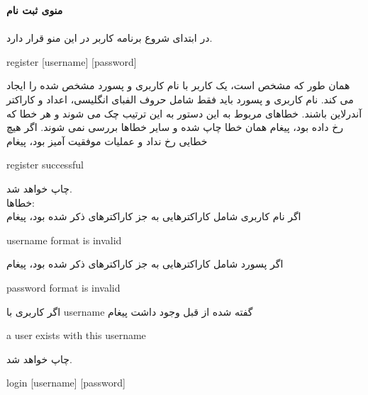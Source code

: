 \documentclass[]{article}
\begin{document}
\textbf{منوی ثبت نام}
\\\\در ابتدای شروع برنامه کاربر در این منو قرار دارد.
\begin{tcolorbox}[boxrule=0pt]
	\begin{latin}
  	  \large{
  	  	register [username] [password]
		}
	\end{latin}
\end{tcolorbox}
همان طور که مشخص است، یک کاربر با نام کاربری و پسورد مشخص شده را ایجاد می کند. نام کاربری و پسورد باید فقط شامل حروف الفبای انگلیسی، اعداد و کاراکتر آندرلاین  باشند. خطاهای مربوط به این دستور به این ترتیب چک می شوند و هر خطا که رخ داده بود، پیغام همان خطا چاپ شده و سایر خطاها بررسی نمی شوند. اگر هیچ خطایی رخ نداد و عملیات موفقیت آمیز بود، پیغام
\begin{tcolorbox}[boxrule=0pt]
	\begin{latin}
  	  \large{
  	  	register successful
		}
	\end{latin}
\end{tcolorbox}

چاپ خواهد شد.\\


خطاها:
\\اگر نام کاربری شامل کاراکترهایی به جز کاراکترهای ذکر شده بود، پیغام
\begin{tcolorbox}[boxrule=0pt]
	\begin{latin}
  	  \large{
  	  	username format is invalid
		}
	\end{latin}
\end{tcolorbox}
\newpage
اگر پسورد شامل کاراکترهایی به جز کاراکترهای ذکر شده بود، پیغام
\begin{tcolorbox}[boxrule=0pt]
	\begin{latin}
  	  \large{
  	  	password format is invalid
		}
	\end{latin}
\end{tcolorbox}
اگر کاربری با username گفته شده از قبل وجود داشت پیغام

\begin{tcolorbox}[boxrule=0pt]
	\begin{latin}
		\large{
			a user exists with this username
		}
	\end{latin}
\end{tcolorbox}
چاپ خواهد شد.\\

\hrulefill


\begin{tcolorbox}[boxrule=0pt]
	\begin{latin}
  	  \large{
  	  	login [username] [password]
		}
	\end{latin}
\end{tcolorbox}
\end{document}
